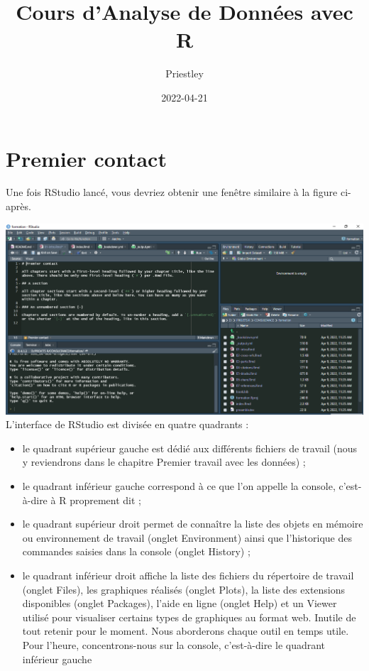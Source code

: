 \documentclass[
]{book}
\title{Cours d'Analyse de Données avec R}
\author{Priestley}
\date{2022-04-21}
\providecommand{\tightlist}{%
  \setlength{\itemsep}{0pt}\setlength{\parskip}{0pt}}
\begin{document}
\maketitle

{
\setcounter{tocdepth}{1}
\tableofcontents
}
\hypertarget{premier-contact}{%
\chapter{Premier contact}\label{premier-contact}}

Une fois RStudio lancé, vous devriez obtenir une fenêtre similaire à la figure ci-après.

\includegraphics[width=1\linewidth]{images/Capture}
L'interface de RStudio est divisée en quatre quadrants :

\begin{itemize}
\tightlist
\item
  le quadrant supérieur gauche est dédié aux différents fichiers de travail (nous y reviendrons dans le chapitre Premier travail avec les données) ;
\item
  le quadrant inférieur gauche correspond à ce que l'on appelle la console, c'est-à-dire à R proprement dit ;
\item
  le quadrant supérieur droit permet de connaître
  la liste des objets en mémoire ou environnement de travail (onglet Environment)
  ainsi que l'historique des commandes saisies dans la console (onglet History) ;
\item
  le quadrant inférieur droit affiche
  la liste des fichiers du répertoire de travail (onglet Files),
  les graphiques réalisés (onglet Plots),
  la liste des extensions disponibles (onglet Packages),
  l'aide en ligne (onglet Help)
  et un Viewer utilisé pour visualiser certains types de graphiques au format web.
  Inutile de tout retenir pour le moment. Nous aborderons chaque outil en temps utile. Pour l'heure, concentrons-nous sur la console, c'est-à-dire le quadrant inférieur gauche
\end{itemize}
\end{document}
